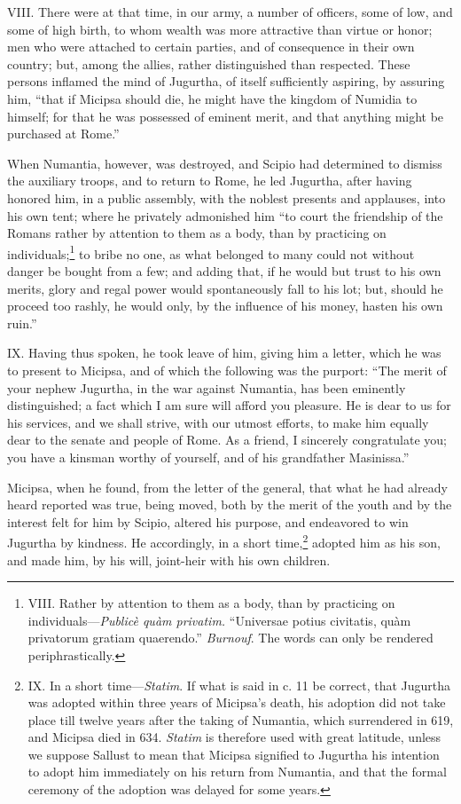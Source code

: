 VIII. There were at that time, in our army, a number of officers, some
of low, and some of high birth, to whom wealth was more attractive
than virtue or honor; men who were attached to certain parties, and of
consequence in their own country; but, among the allies, rather
distinguished than respected. These persons inflamed the mind of
Jugurtha, of itself sufficiently aspiring, by assuring him, ``that if
Micipsa should die, he might have the kingdom of Numidia to himself;
for that he was possessed of eminent merit, and that anything might be
purchased at Rome.''

When Numantia, however, was destroyed, and Scipio had determined to
dismiss the auxiliary troops, and to return to Rome, he led Jugurtha,
after having honored him, in a public assembly, with the noblest
presents and applauses, into his own tent; where he privately
admonished him ``to court the friendship of the Romans rather by
attention to them as a body, than by practicing on individuals;\footnote{VIII. Rather by attention to them as a body, than by practicing
on individuals—\emph{Publicè quàm privatim.} ``Universae potius civitatis,
quàm privatorum gratiam quaerendo.'' \emph{Burnouf}. The words can only be
rendered periphrastically.}
to bribe no one, as what belonged to many could not without danger be
bought from a few; and adding that, if he would but trust to his own
merits, glory and regal power would spontaneously fall to his lot;
but, should he proceed too rashly, he would only, by the influence of
his money, hasten his own ruin.''

IX. Having thus spoken, he took leave of him, giving him a letter,
which he was to present to Micipsa, and of which the following was
the purport: ``The merit of your nephew Jugurtha, in the war against
Numantia, has been eminently distinguished; a fact which I am sure
will afford you pleasure. He is dear to us for his services, and we
shall strive, with our utmost efforts, to make him equally dear to the
senate and people of Rome. As a friend, I sincerely congratulate you;
you have a kinsman worthy of yourself, and of his grandfather
Masinissa.''

Micipsa, when he found, from the letter of the general, that what he
had already heard reported was true, being moved, both by the merit of
the youth and by the interest felt for him by Scipio, altered his
purpose, and endeavored to win Jugurtha by kindness. He accordingly,
in a short time,\footnote{IX. In a short time—\emph{Statim}. If what is said in c. 11 be
correct, that Jugurtha was adopted within three years of Micipsa's
death, his adoption did not take place till twelve years after the
taking of Numantia, which surrendered in 619, and Micipsa died in 634.
\emph{Statim} is therefore used with great latitude, unless we suppose
Sallust to mean that Micipsa signified to Jugurtha his intention to
adopt him immediately on his return from Numantia, and that the formal
ceremony of the adoption was delayed for some years.} adopted him as his son, and made him, by his
will, joint-heir with his own children.

